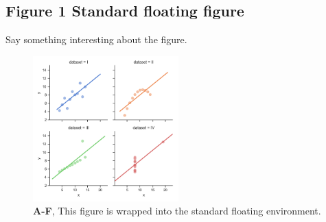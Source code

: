 \documentclass[11pt]{article}
\begin{document}
\subsection*{{\bfseries\sffamily } Figure 1 Standard floating figure}
\label{sec:orgd7ac78a}
Say something interesting about the figure. \lipsum[1-2]
\begin{figure}[ht] %
  \includegraphics[width=0.5\textwidth]{test.png}
  
  \caption{\color{Gray} \textbf{A-F}, This figure is wrapped into the standard floating environment.}
  \label{fig2} %

\end{figure}
\end{document}
